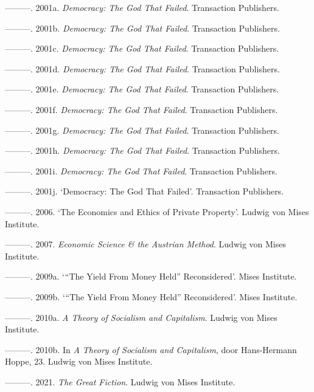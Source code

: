 \documentclass[
  a5paper,
  smalldemyvopaper,11pt,twoside,onecolumn,openright,extrafontsizes,
hidelinks]{memoir}
\newlength{\cslhangindent}
\newenvironment{CSLReferences}[2] %
 {\begin{list}{}{%
  \setlength{\itemindent}{0pt}
  \setlength{\leftmargin}{0pt}
  \setlength{\parsep}{0pt}
  \ifodd #1
   \setlength{\leftmargin}{\cslhangindent}
   \setlength{\itemindent}{-1\cslhangindent}
  \fi
  \setlength{\itemsep}{#2\baselineskip}}}
 {\end{list}}
\begin{document}
\begin{CSLReferences}{1}{0}
---------. 2001a. \emph{Democracy: The God That Failed}. Transaction
Publishers.

---------. 2001b. \emph{Democracy: The God That Failed}. Transaction
Publishers.

---------. 2001c. \emph{Democracy: The God That Failed}. Transaction
Publishers.

---------. 2001d. \emph{Democracy: The God That Failed}. Transaction
Publishers.

---------. 2001e. \emph{Democracy: The God That Failed}. Transaction
Publishers.

---------. 2001f. \emph{Democracy: The God That Failed}. Transaction
Publishers.

---------. 2001g. \emph{Democracy: The God That Failed}. Transaction
Publishers.

---------. 2001h. \emph{Democracy: The God That Failed}. Transaction
Publishers.

---------. 2001i. \emph{Democracy: The God That Failed}. Transaction
Publishers.

---------. 2001j. {`Democracy: The God That Failed'}. Transaction
Publishers.

---------. 2006. {`The Economics and Ethics of Private Property'}.
Ludwig von Mises Institute.

---------. 2007. \emph{Economic Science \& the Austrian Method}. Ludwig
von Mises Institute.

---------. 2009a. {`{``The Yield From Money Held''} Reconsidered'}.
Mises Institute.

---------. 2009b. {`{``The Yield From Money Held''} Reconsidered'}.
Mises Institute.

---------. 2010a. \emph{A Theory of Socialism and Capitalism}. Ludwig
von Mises Institute.

---------. 2010b. In \emph{A Theory of Socialism and Capitalism}, door
Hans-Hermann Hoppe, 23. Ludwig von Mises Institute.

---------. 2021. \emph{The Great Fiction}. Ludwig von Mises Institute.


\end{CSLReferences}
\end{document}
